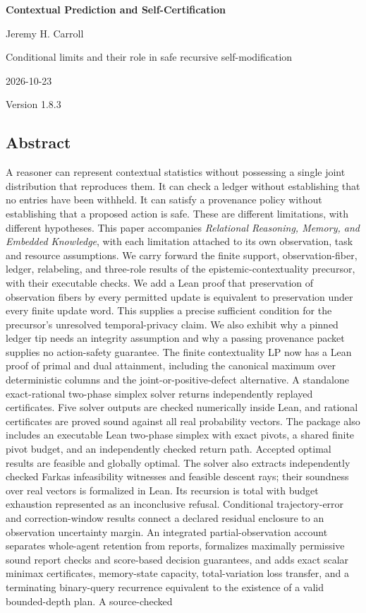 \documentclass[
  10pt,
]{article}
\author{}
\date{}
\begin{document}
\begin{center}
{\LARGE\bfseries Contextual Prediction and Self-Certification\par}
Jeremy H. Carroll\par
Conditional limits and their role in safe recursive self-modification\par
2026-10-23\par
Version 1.8.3\par
\end{center}

\subsection{Abstract}\label{abstract}

A reasoner can represent contextual statistics without possessing a single joint distribution that reproduces them. It can check a ledger without establishing that no entries have been withheld. It can satisfy a provenance policy without establishing that a proposed action is safe. These are different limitations, with different hypotheses. This paper accompanies \emph{Relational Reasoning, Memory, and Embedded Knowledge}, with each limitation attached to its own observation, task and resource assumptions. We carry forward the finite support, observation-fiber, ledger, relabeling, and three-role results of the epistemic-contextuality precursor, with their executable checks. We add a Lean proof that preservation of observation fibers by every permitted update is equivalent to preservation under every finite update word. This supplies a precise sufficient condition for the precursor's unresolved temporal-privacy claim. We also exhibit why a pinned ledger tip needs an integrity assumption and why a passing provenance packet supplies no action-safety guarantee. The finite contextuality LP now has a Lean proof of primal and dual attainment, including the canonical maximum over deterministic columns and the joint-or-positive-defect alternative. A standalone exact-rational two-phase simplex solver returns independently replayed certificates. Five solver outputs are checked numerically inside Lean, and rational certificates are proved sound against all real probability vectors. The package also includes an executable Lean two-phase simplex with exact pivots, a shared finite pivot budget, and an independently checked return path. Accepted optimal results are feasible and globally optimal. The solver also extracts independently checked Farkas infeasibility witnesses and feasible descent rays; their soundness over real vectors is formalized in Lean. Its recursion is total with budget exhaustion represented as an inconclusive refusal. Conditional trajectory-error and correction-window results connect a declared residual enclosure to an observation uncertainty margin. An integrated partial-observation account separates whole-agent retention from reports, formalizes maximally permissive sound report checks and score-based decision guarantees, and adds exact scalar minimax certificates, memory-state capacity, total-variation loss transfer, and a terminating binary-query recurrence equivalent to the existence of a valid bounded-depth plan. A source-checked 
\end{document}

